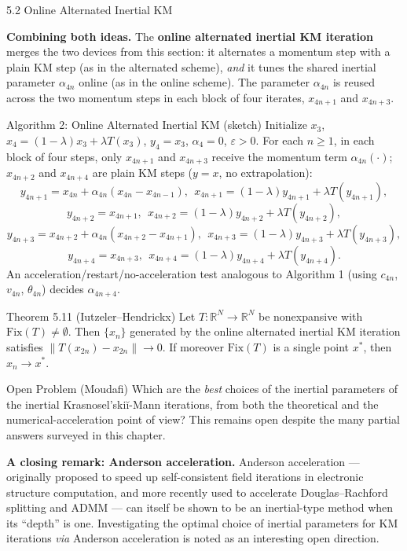 \documentclass[aspectratio=169,10pt]{beamer}
\newcommand{\norm}[1]{\left\|#1\right\|}
\newcommand{\Fix}{\mathrm{Fix}}
\newcommand{\R}{\mathbb{R}}
\begin{document}
\begin{frame}[allowframebreaks]{5.2 Online Alternated Inertial KM}

  \textbf{Combining both ideas.}  The \textbf{online alternated
  inertial KM iteration} merges the two devices from this section:
  it alternates a momentum step with a plain KM step (as in the
  alternated scheme), \emph{and} it tunes the shared inertial
  parameter $\alpha_{4n}$ online (as in the online scheme). The
  parameter $\alpha_{4n}$ is reused across the two momentum steps
  in each block of four iterates, $x_{4n+1}$ and $x_{4n+3}$.

  \begin{block}{Algorithm 2: Online Alternated Inertial KM (sketch)}
    \footnotesize
    Initialize $x_3$, $x_4=(1-\lambda)x_3+\lambda T(x_3)$, $y_4=x_3$,
    $\alpha_4=0$, $\varepsilon>0$. For each $n\ge1$, in each block
    of four steps, only $x_{4n+1}$ and $x_{4n+3}$ receive the
    momentum term $\alpha_{4n}(\cdot)$; $x_{4n+2}$ and $x_{4n+4}$ are
    plain KM steps ($y=x$, no extrapolation):
    \[
      y_{4n+1}=x_{4n}+\alpha_{4n}(x_{4n}-x_{4n-1}),\ \
      x_{4n+1}=(1-\lambda)y_{4n+1}+\lambda T(y_{4n+1}),
    \]
    \[
      y_{4n+2}=x_{4n+1},\ \ x_{4n+2}=(1-\lambda)y_{4n+2}+\lambda T(y_{4n+2}),
    \]
    \[
      y_{4n+3}=x_{4n+2}+\alpha_{4n}(x_{4n+2}-x_{4n+1}),\ \
      x_{4n+3}=(1-\lambda)y_{4n+3}+\lambda T(y_{4n+3}),
    \]
    \[
      y_{4n+4}=x_{4n+3},\ \ x_{4n+4}=(1-\lambda)y_{4n+4}+\lambda T(y_{4n+4}).
    \]
    An acceleration/restart/no-acceleration test analogous to
    Algorithm 1 (using $c_{4n}$, $v_{4n}$, $\theta_{4n}$) decides
    $\alpha_{4n+4}$.
  \end{block}

  \framebreak

  \begin{alertblock}{Theorem 5.11 (Iutzeler--Hendrickx)}
    Let $T:\R^N\to\R^N$ be nonexpansive with $\Fix(T)\neq\emptyset$.
    Then $\{x_n\}$ generated by the online alternated inertial KM
    iteration satisfies $\norm{T(x_{2n})-x_{2n}}\to0$. If moreover
    $\Fix(T)$ is a single point $x^*$, then $x_n\to x^*$.
  \end{alertblock}

  \begin{block}{Open Problem (Moudafi)}
    Which are the \emph{best} choices of the inertial parameters
    of the inertial Krasnosel'ski\u{i}-Mann iterations, from both
    the theoretical and the numerical-acceleration point of view?
    This remains open despite the many partial answers surveyed in
    this chapter.
  \end{block}

  \textbf{A closing remark: Anderson acceleration.}  Anderson
  acceleration --- originally proposed to speed up self-consistent
  field iterations in electronic structure computation, and more
  recently used to accelerate Douglas--Rachford splitting and ADMM
  --- can itself be shown to be an inertial-type method when its
  ``depth'' is one. Investigating the optimal choice of inertial
  parameters for KM iterations \emph{via} Anderson acceleration is
  noted as an interesting open direction.

\end{frame}
\end{document}
